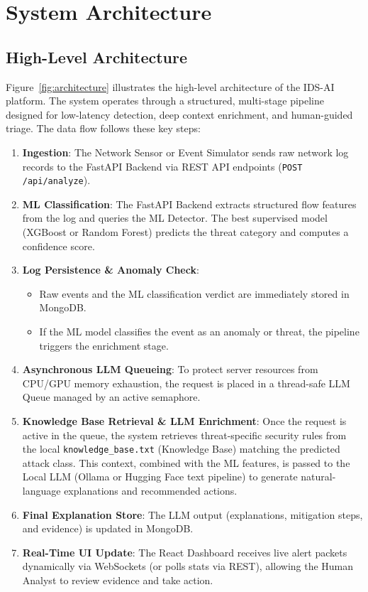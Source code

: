 \documentclass[12pt,a4paper]{report}
\begin{document}
\section{System Architecture}

\subsection{High-Level Architecture}

Figure~\ref{fig:architecture} illustrates the high-level architecture of the IDS-AI platform. The system operates through a structured, multi-stage pipeline designed for low-latency detection, deep context enrichment, and human-guided triage. The data flow follows these key steps:

\begin{enumerate}[leftmargin=1.5em]
  \item \textbf{Ingestion}: The Network Sensor or Event Simulator sends raw network log records to the FastAPI Backend via REST API endpoints (\texttt{POST /api/analyze}).
  \item \textbf{ML Classification}: The FastAPI Backend extracts structured flow features from the log and queries the ML Detector. The best supervised model (XGBoost or Random Forest) predicts the threat category and computes a confidence score.
  \item \textbf{Log Persistence \& Anomaly Check}:
    \begin{itemize}[leftmargin=1.5em]
      \item Raw events and the ML classification verdict are immediately stored in MongoDB.
      \item If the ML model classifies the event as an anomaly or threat, the pipeline triggers the enrichment stage.
    \end{itemize}
  \item \textbf{Asynchronous LLM Queueing}: To protect server resources from CPU/GPU memory exhaustion, the request is placed in a thread-safe LLM Queue managed by an active semaphore.
  \item \textbf{Knowledge Base Retrieval \& LLM Enrichment}: Once the request is active in the queue, the system retrieves threat-specific security rules from the local \texttt{knowledge\_base.txt} (Knowledge Base) matching the predicted attack class. This context, combined with the ML features, is passed to the Local LLM (Ollama or Hugging Face text pipeline) to generate natural-language explanations and recommended actions.
  \item \textbf{Final Explanation Store}: The LLM output (explanations, mitigation steps, and evidence) is updated in MongoDB.
  \item \textbf{Real-Time UI Update}: The React Dashboard receives live alert packets dynamically via WebSockets (or polls stats via REST), allowing the Human Analyst to review evidence and take action.
\end{enumerate}
\end{document}

